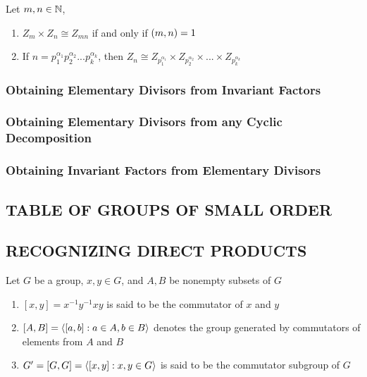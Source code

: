\begin{proposition}
	Let $m, n \in \mathbb{N}$,
	\begin{enumerate}
		\item $Z_m \times Z_n \cong Z_{mn}$ if and only if $(m, n) = 1$
		\item If $n = p_1^{\alpha_1} p_2^{\alpha_2} ... p_k^{\alpha_k}$, then $Z_n \cong Z_{p_1^{\alpha_1}} \times Z_{p_2^{\alpha_2}} \times ... \times Z_{p_k^{\alpha_k}}$
	\end{enumerate}
\end{proposition}

\subsubsection{Obtaining Elementary Divisors from Invariant Factors}
\subsubsection{Obtaining Elementary Divisors from any Cyclic Decomposition}
\subsubsection{Obtaining Invariant Factors from Elementary Divisors}

\subsection{TABLE OF GROUPS OF SMALL ORDER}

\subsection{RECOGNIZING DIRECT PRODUCTS}

\begin{definition}
	Let $G$ be a group, $x, y \in G$, and $A, B$ be nonempty subsets of $G$
	\begin{enumerate}
		\item $[x, y] = x^{-1} y^{-1} x y$ is said to be the commutator of $x$ and $y$
		\item $[A, B] = \langle[a, b]: a \in A, b \in B\rangle$ denotes the group generated by commutators of elements from $A$ and $B$
		\item $G' = [G, G] = \langle[x, y]: x, y \in G\rangle$ is said to be the commutator subgroup of $G$
	\end{enumerate}
\end{definition}

